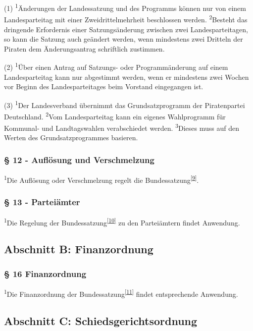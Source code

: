 (1) \textsuperscript{1}Änderungen der Landessatzung und des Programms
können nur von einem Landesparteitag mit einer Zweidrittelmehrheit
beschlossen werden. \textsuperscript{2}Besteht das dringende Erfordernis
einer Satzungsänderung zwischen zwei Landesparteitagen, so kann die
Satzung auch geändert werden, wenn mindestens zwei Dritteln der Piraten
dem Änderungsantrag schriftlich zustimmen.

(2) \textsuperscript{1}Über einen Antrag auf Satzungs- oder
Programmänderung auf einem Landesparteitag kann nur abgestimmt werden,
wenn er mindestens zwei Wochen vor Beginn des Landesparteitages beim
Vorstand eingegangen ist.

(3) \textsuperscript{1}Der Landesverband übernimmt das Grundsatzprogramm
der Piratenpartei Deutschland. \textsuperscript{2}Vom Landesparteitag
kann ein eigenes Wahlprogramm für Kommunal- und Landtagswahlen
verabschiedet werden. \textsuperscript{3}Dieses muss auf den Werten des
Grundsatzprogrammes basieren.

\subsubsection{§ 12 - Auflösung und Verschmelzung}

\textsuperscript{1}Die Auflösung oder Verschmelzung regelt die
Bundessatzung\textsuperscript{\href{\#cite\_note-8}{{[}9{]}}}.

\subsubsection{§ 13 - Parteiämter}

\textsuperscript{1}Die Regelung der
Bundessatzung\textsuperscript{\href{\#cite\_note-9}{{[}10{]}}} zu den
Parteiämtern findet Anwendung.

\bigskip

\subsection{Abschnitt B: Finanzordnung}

\subsubsection{§ 16 Finanzordnung}

\textsuperscript{1}Die Finanzordnung der
Bundessatzung\textsuperscript{\href{\#cite\_note-10}{{[}11{]}}} findet
entsprechende Anwendung.

\subsection{Abschnitt C: Schiedsgerichtsordnung}

